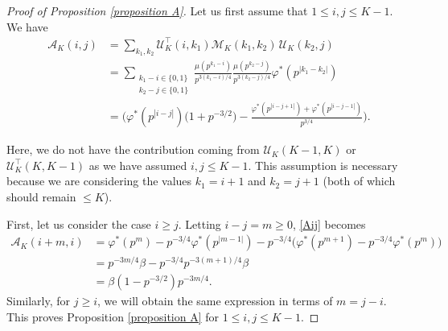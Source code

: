 \documentclass[10pt,a4paper]{amsart}
\newcommand{\A}{\mathcal{A}}
\newcommand{\Mcal}{\mathcal{M}}
\newcommand{\U}{\mathcal{U}}
\newcommand{\bt}{\beta}
\begin{document}
\begin{proof}[Proof of Proposition \ref{proposition A}]

Let us first assume that $1 \leq i, j \leq K-1$. We have 
%
\begin{equation}
\begin{split}
\label{Aij}
\A_K(i,j) &= \sum\limits_{k_1, k_2} \U_K^{\top}(i, k_1) \Mcal_K(k_1, k_2) \,\U_K(k_2, j)\\
&= \sum\limits_{\substack{k_1 - i \in \{0,1\} \\ k_2 - j \in \{0,1\} } } \frac{\mu(p^{k_1 - i})}{p^{3(k_1-i)/4}} \frac{\mu(p^{k_2 - j})}{p^{3(k_2-j)/4}} \varphi^*(p^{|k_1 - k_2|})\\
&= \biggl( \varphi^*(p^{|i-j|}) \bigl( 1 + p^{-3/2} \bigr) - \frac{\varphi^*(p^{|i-j+1|}) + \varphi^*(p^{|i-j-1|}) }{p^{3/4}} \biggr).
\end{split}
\end{equation}


Here, we do not have the contribution coming from $\U_K(K-1, K)$ or $\U_K^{\top} (K, K-1)$ as we have assumed $i, j \leq K-1$. This assumption is necessary because we are considering the values $k_1 = i+1$ and $k_2 = j+1$ (both of which should remain $\leq K$). 

\medskip

First, let us consider the case $i \geq j$. Letting $i-j = m \geq 0$, \eqref{Aij} becomes 
\begin{equation*}
\begin{split}
\A_K(i+m, i) &= \varphi^*(p^m)  - p^{-3/4} \varphi^*(p^{|m-1|}) - p^{-3/4} \bigl( \varphi^*(p^{m+1}) - p^{-3/4} \varphi^*(p^m) \bigr) \\
&= p^{-3m/4} \bt - p^{-3/4} p^{-3(m+1)/4} \bt \\
&= \bt(1 - p^{-3/2}) p^{-3m/4}.
\end{split}
\end{equation*}
%
Similarly, for $j \geq i$, we will obtain the same expression in terms of $m = j-i$. This proves Proposition \ref{proposition A} for $1 \leq i,j \leq K-1$. 


\end{proof}
\end{document}
